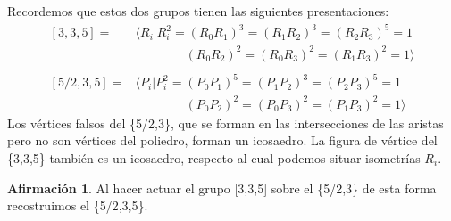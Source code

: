 \documentclass[spanish]{article}
\theoremstyle{definition}
\newtheorem*{af}{Afirmación}
\begin{document}
Recordemos que estos dos grupos tienen las siguientes presentaciones:
\begin{align*}\label{rels}
	[3,3,5]=&\langle R_i|R_i^2=(R_0R_1)^3=(R_1R_2)^3=(R_2R_3)^5=1\\
	&\qquad\qquad(R_0R_2)^2=(R_0R_3)^2=(R_1R_3)^2=1\rangle\\ \\
	[5/2,3,5]=&\langle P_i|P_i^2=(P_0P_1)^5=(P_1P_2)^3=(P_2P_3)^5=1\\
	&\qquad\qquad(P_0P_2)^2=(P_0P_3)^2=(P_1P_3)^2=1\rangle
\end{align*}
Los vértices falsos del \{5/2,3\}, que se forman en las intersecciones de las aristas pero no son vértices del poliedro, forman un icosaedro. La figura de vértice del \{3,3,5\} también es un icosaedro, respecto al cual podemos situar isometrías $R_i$.
\begin{af} Al hacer actuar el grupo [3,3,5] sobre el \{5/2,3\} de esta forma recostruimos el \{5/2,3,5\}.
\end{af}
\end{document}
